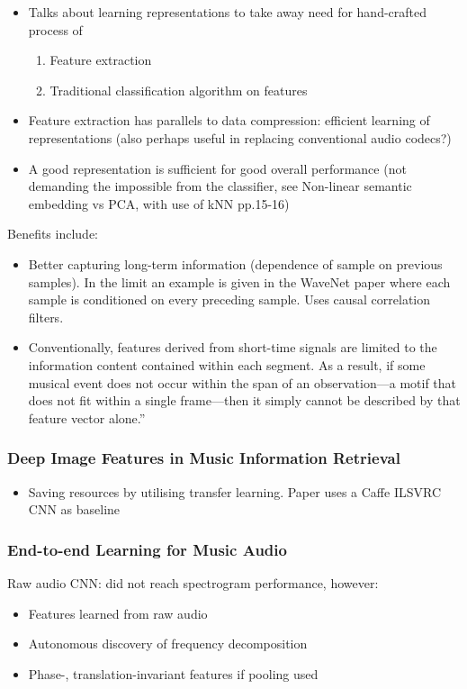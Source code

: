 \documentclass[12pt]{llncs}
\begin{document}
\begin{itemize}
	\item Talks about learning representations to take away need for hand-crafted process of 

\begin{enumerate} 
	\item Feature extraction
	\item Traditional classification algorithm on features
\end{enumerate}
	\item Feature extraction has parallels to data compression: efficient learning of representations (also perhaps useful in replacing conventional audio codecs?)
	\item A good representation is sufficient for good overall performance (not demanding the impossible from the classifier, see Non-linear semantic embedding vs PCA, with use of kNN pp.15-16)
\end{itemize}
Benefits include:
\begin{itemize}
	\item Better capturing long-term information (dependence of sample on previous samples). In the limit an example is given in the WaveNet paper \cite{van2016wavenet} where each sample is conditioned on every preceding sample. Uses causal correlation filters. 

	\item Conventionally, features derived from short-time signals are limited to the information content contained within each segment. As a result, if some musical event does not occur within the span of an observation---a motif that does not fit within a single frame---then it simply cannot be described by that feature vector alone.”





\end{itemize}


\subsubsection*{Deep Image Features in Music Information Retrieval \cite{gwardys2014deep}}
\begin{itemize}
	\item Saving resources by utilising transfer learning. Paper uses a Caffe ILSVRC CNN as baseline 
\end{itemize}



\subsubsection*{End-to-end Learning for Music Audio \cite{dieleman2014end}}
Raw audio CNN: did not reach spectrogram performance, however:
\begin{itemize}
	\item Features learned from raw audio
	\item Autonomous discovery of frequency decomposition
	\item Phase-, translation-invariant features if pooling used
\end{itemize}
\end{document}
